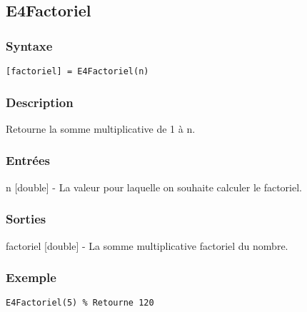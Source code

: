 \begin{minipage}{\linewidth}
\subsection*{E4Factoriel}
\subsubsection*{Syntaxe}
\begin{lstlisting}
[factoriel] = E4Factoriel(n)
\end{lstlisting}
\subsubsection*{Description}
Retourne la somme multiplicative de 1 à n.
\subsubsection*{Entrées}
\begin{description}
\item n [double] - La valeur pour laquelle on souhaite calculer le factoriel. 
\end{description} \subsubsection*{Sorties}
\begin{description}
\item factoriel [double] - La somme multiplicative factoriel du nombre. 
\end{description} 
\subsubsection*{Exemple}
\begin{lstlisting}
E4Factoriel(5) % Retourne 120
\end{lstlisting} \medskip
\end{minipage}